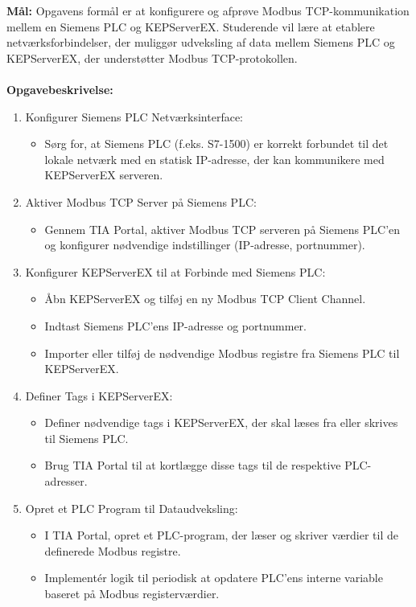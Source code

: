 \textbf{Mål:} Opgavens formål er at konfigurere og afprøve Modbus TCP-kommunikation mellem en Siemens PLC og KEPServerEX. Studerende vil lære at etablere netværksforbindelser, der muliggør udveksling af data mellem Siemens PLC og KEPServerEX, der understøtter Modbus TCP-protokollen.
\\\\
\noindent\textbf{Opgavebeskrivelse:}
\begin{enumerate}
	\item Konfigurer Siemens PLC Netværksinterface:
	\begin{itemize}
		\item Sørg for, at Siemens PLC (f.eks. S7-1500) er korrekt forbundet til det lokale netværk med en statisk IP-adresse, der kan kommunikere med KEPServerEX serveren.
	\end{itemize}
	\item Aktiver Modbus TCP Server på Siemens PLC:
	\begin{itemize}
		\item Gennem TIA Portal, aktiver Modbus TCP serveren på Siemens PLC'en og konfigurer nødvendige indstillinger (IP-adresse, portnummer).
	\end{itemize}
	\item Konfigurer KEPServerEX til at Forbinde med Siemens PLC:
	\begin{itemize}
		\item Åbn KEPServerEX og tilføj en ny Modbus TCP Client Channel.
		\item Indtast Siemens PLC’ens IP-adresse og portnummer.
		\item Importer eller tilføj de nødvendige Modbus registre fra Siemens PLC til KEPServerEX.
	\end{itemize}
	\item Definer Tags i KEPServerEX:
	\begin{itemize}
		\item Definer nødvendige tags i KEPServerEX, der skal læses fra eller skrives til Siemens PLC.
		\item Brug TIA Portal til at kortlægge disse tags til de respektive PLC-adresser.
	\end{itemize}
	\item Opret et PLC Program til Dataudveksling:
	\begin{itemize}
		\item I TIA Portal, opret et PLC-program, der læser og skriver værdier til de definerede Modbus registre.
		\item Implementér logik til periodisk at opdatere PLC'ens interne variable baseret på Modbus registerværdier.

\end{itemize}
\end{enumerate}
